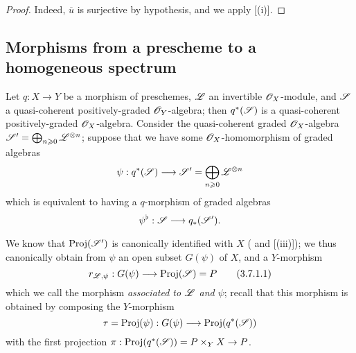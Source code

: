 \begin{proof}
Indeed, $\overline{u}$ is surjective by hypothesis, and we apply [(i)].
\end{proof}


\subsection{Morphisms from a prescheme to a homogeneous spectrum}
\label{subsection:II.3.7}

\begin{env}[3.7.1]
\label{II.3.7.1}
Let $q:X\to Y$ be a morphism of preschemes, $\mathscr{L}$ an invertible $\mathscr{O}_X$-module, and $\mathscr{S}$ a quasi-coherent positively-graded $\mathscr{O}_Y$-algebra;
then $q^*(\mathscr{S})$ is a quasi-coherent positively-graded $\mathscr{O}_X$-algebra.
Consider the quasi-coherent graded $\mathscr{O}_X$-algebra $\mathscr{S}'=\bigoplus_{n\geqslant0}\mathscr{L}^{\otimes n}$;
suppose that we have some $\mathscr{O}_X$-homomorphism of graded algebras
\[
  \psi : q^*(\sh{S}) \to \sh{S}' = \bigoplus_{n\geq0}\sh{L}^{\otimes n}
\]
which is equivalent to having a $q$-morphism of graded algebras
\[
  \psi^\flat : \sh{S} \to q_*(\sh{S}').
\]

We know that $\operatorname{Proj}(\mathscr{S}')$ is canonically identified with $X$ ( and [(iii)]);
we thus canonically obtain from $\psi$ an open subset $G(\psi)$ of $X$, and a $Y$-morphism
\[
\label{II.3.7.1.1}
  r_{\sh{L},\psi} : G(\psi) \to \Proj(\sh{S}) = P
\tag{3.7.1.1}
\]
which we call the morphism \emph{associated to $\mathscr{L}$ and $\psi$};
recall  that this morphism is obtained by composing the $Y$-morphism
\[
  \tau = \Proj(\psi) : G(\psi) \to \Proj(q^*(\sh{S}))
\]
with the first projection $\pi:\Proj(q^*(\sh{S}))=P\times_Y X\to P$.
\end{env}

